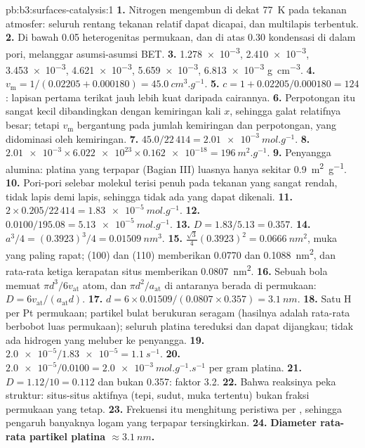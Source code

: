 \begin{solution}{pb:b3:surfaces-catalysis:1}
\textbf{1.} Nitrogen mengembun di dekat \qty{77}{K} pada tekanan atmosfer: seluruh rentang
tekanan relatif dapat dicapai, dan multilapis terbentuk.
\textbf{2.} Di bawah 0.05 heterogenitas permukaan, dan di atas 0.30 kondensasi di
dalam pori, melanggar asumsi-asumsi BET.
\textbf{3.} \num{1.278e-3}, \num{2.410e-3}, \num{3.453e-3}, \num{4.621e-3}, \num{5.659e-3}, \num{6.813e-3} \unit{g.cm^{-3}}.
\textbf{4.} $v_{\mathrm m} = 1/(0.02205 + 0.000180) = \qty{45.0}{cm^3.g^{-1}}$.
\textbf{5.} $c = 1 + 0.02205/0.000180 = 124$: lapisan pertama terikat jauh lebih kuat
daripada cairannya.
\textbf{6.} Perpotongan itu sangat kecil dibandingkan dengan kemiringan kali $x$,
sehingga galat relatifnya besar; tetapi $v_{\mathrm m}$ bergantung pada jumlah kemiringan dan perpotongan,
yang didominasi oleh kemiringan.
\textbf{7.} $45.0/22\,414 = \qty{2.01e-3}{mol.g^{-1}}$.
\textbf{8.} $\num{2.01e-3} \times \num{6.022e23} \times \num{0.162e-18} = \qty{196}{m^2.g^{-1}}$.
\textbf{9.} Penyangga alumina: platina yang terpapar (Bagian III) luasnya hanya sekitar \qty{0.9}{m^2.g^{-1}}.
\textbf{10.} Pori-pori selebar molekul terisi penuh pada tekanan yang sangat
rendah, tidak lapis demi lapis, sehingga tidak ada  yang dapat
dikenali.
\textbf{11.} $2 \times 0.205/22\,414 = \qty{1.83e-5}{mol.g^{-1}}$.
\textbf{12.} $0.0100/195.08 = \qty{5.13e-5}{mol.g^{-1}}$.
\textbf{13.} $D = 1.83/5.13 = 0.357$.
\textbf{14.} $a^3/4 = (0.3923)^3/4 = \qty{0.01509}{nm^3}$.
\textbf{15.} $\frac{\sqrt3}{4}(0.3923)^2 = \qty{0.0666}{nm^2}$, muka yang paling rapat; (100) dan (110) memberikan 0.0770 dan
\qty{0.1088}{nm^2}, dan rata-rata ketiga kerapatan situs memberikan \qty{0.0807}{nm^2}.
\textbf{16.} Sebuah bola memuat $\pi d^3/6v_{\mathrm{at}}$ atom, dan $\pi d^2/a_{\mathrm{at}}$ di antaranya berada di permukaan:
$D = 6v_{\mathrm{at}}/(a_{\mathrm{at}}d)$.
\textbf{17.} $d = 6 \times 0.01509/(0.0807 \times 0.357) = \qty{3.1}{nm}$.
\textbf{18.} Satu H per Pt permukaan; partikel bulat berukuran seragam (hasilnya
adalah rata-rata berbobot luas permukaan); seluruh platina tereduksi dan
dapat dijangkau; tidak ada hidrogen yang meluber ke penyangga.
\textbf{19.} $\num{2.0e-5}/\num{1.83e-5} = \qty{1.1}{s^{-1}}$.
\textbf{20.} $\num{2.0e-5}/0.0100 = \qty{2.0e-3}{mol.g^{-1}.s^{-1}}$ per gram platina.
\textbf{21.} $D = 1.12/10 = 0.112$ dan bukan 0.357: faktor 3.2.
\textbf{22.} Bahwa reaksinya peka struktur: situs-situs aktifnya (tepi, sudut,
muka tertentu) bukan fraksi permukaan yang tetap.
\textbf{23.} Frekuensi itu menghitung peristiwa per , sehingga
pengaruh banyaknya logam yang terpapar tersingkirkan.
\textbf{24.} \textbf{Diameter rata-rata partikel platina $\approx \qty{3.1}{nm}$.}
\end{solution}
